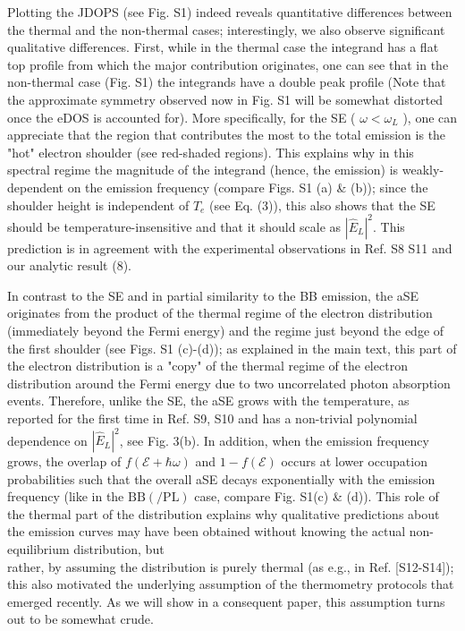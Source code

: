 \documentclass[10pt]{article}
\begin{document}
Plotting the JDOPS (see Fig. S1) indeed reveals quantitative differences between the thermal and the non-thermal cases; interestingly, we also observe significant qualitative differences. First, while in the thermal case the integrand has a flat top profile from which the major contribution originates, one can see that in the non-thermal case (Fig. S1) the integrands have a double peak profile (Note that the approximate symmetry observed now in Fig. S1 will be somewhat distorted once the eDOS is accounted for). More specifically, for the SE ( $\omega<\omega_{L}$ ), one can appreciate that the region that contributes the most to the total emission is the "hot" electron shoulder (see red-shaded regions). This explains why in this spectral regime the magnitude of the integrand (hence, the emission) is weakly-dependent on the emission frequency (compare Figs. S1 (a) \& (b)); since the shoulder height is independent of $T_{e}$ (see Eq. (3)), this also shows that the SE should be temperature-insensitive and that it should scale as $\left|\hat{E}_{L}\right|^{2}$. This prediction is in agreement with the experimental observations in Ref. S8 S11 and our analytic result (8).

In contrast to the SE and in partial similarity to the BB emission, the aSE originates from the product of the thermal regime of the electron distribution (immediately beyond the Fermi energy) and the regime just beyond the edge of the first shoulder (see Figs. S1 (c)-(d)); as explained in the main text, this part of the electron distribution is a "copy" of the thermal regime of the electron distribution around the Fermi energy due to two uncorrelated photon absorption events. Therefore, unlike the SE, the aSE grows with the temperature, as reported for the first time in Ref. S9, S10 and has a non-trivial polynomial dependence on $\left|\hat{E}_{L}\right|^{2}$, see Fig. 3(b). In addition, when the emission frequency grows, the overlap of $f(\mathcal{E}+\hbar \omega)$ and $1- f(\mathcal{E})$ occurs at lower occupation probabilities such that the overall aSE decays exponentially with the emission frequency (like in the $\mathrm{BB}(/ \mathrm{PL})$ case, compare Fig. S1(c) \& (d)). This role of the thermal part of the distribution explains why qualitative predictions about the emission curves may have been obtained without knowing the actual non-equilibrium distribution, but\\[0pt]
rather, by assuming the distribution is purely thermal (as e.g., in Ref. [S12-S14]); this also motivated the underlying assumption of the thermometry protocols that emerged recently. As we will show in a consequent paper, this assumption turns out to be somewhat crude.
\end{document}

